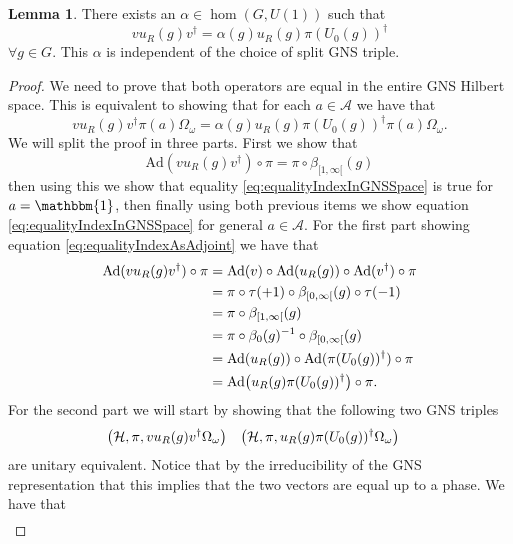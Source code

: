 \documentclass[12pt,a4paper,twoside]{article}
\let\originalleft\left
\let\originalright\right
\renewcommand{\left}{\mathopen{}\mathclose\bgroup\originalleft}
\renewcommand{\right}{\aftergroup\egroup\originalright}
\newcommand{\HH}{\mathcal H}
\renewcommand{\AA}{\mathcal A}
\newcommand{\one}{\mathbbm{1}}
\newcommand{\Ad}{\textrm{Ad}}
\theoremstyle{definition}
\newtheorem{lemma}[theorem]{Lemma}
\numberwithin{equation}{section}
\begin{document}
\begin{lemma}
	There exists an $\alpha\in\hom(G,U(1))$ such that
	\begin{equation}
		v u_R(g)v^\dagger =\alpha(g) u_R(g)\pi(U_0(g))^\dagger
	\end{equation}
	$\forall g\in G$. This $\alpha$ is independent of the choice of split GNS triple.
\end{lemma}
\begin{proof}
	We need to prove that both operators are equal in the entire GNS Hilbert space. This is equivalent to showing that for each $a\in\AA$ we have that
	\begin{equation}\label{eq:equalityIndexInGNSSpace}
		v u_R(g)v^\dagger \pi(a)\Omega_\omega =\alpha(g) u_R(g)\pi(U_0(g))^\dagger\pi(a)\Omega_\omega.
	\end{equation}
	We will split the proof in three parts. First we show that
	\begin{equation}\label{eq:equalityIndexAsAdjoint}
		\Ad(v u_R(g)v^\dagger)\circ\pi=\pi\circ\beta_{[1,\infty[}(g)
	\end{equation}
	then using this we show that equality \eqref{eq:equalityIndexInGNSSpace} is true for $a=\one$, then finally using both previous items we show equation \eqref{eq:equalityIndexInGNSSpace} for general $a\in\AA$. For the first part showing equation \eqref{eq:equalityIndexAsAdjoint} we have that
	\begin{align}
		\Ad(v u_R(g)v^\dagger)\circ\pi&=\Ad(v)\circ\Ad(u_R(g))\circ\Ad(v^\dagger)\circ\pi\\
		&=\pi\circ\tau(+1)\circ\beta_{[0,\infty[}(g)\circ\tau(-1)\\
		&=\pi\circ\beta_{[1,\infty[}(g)\\
		&=\pi\circ\beta_0(g)^{-1}\circ\beta_{[0,\infty[}(g)\\
		&=\Ad(u_R(g))\circ\Ad(\pi(U_0(g))^\dagger)\circ\pi\\
		&=\Ad\left(u_R(g)\pi(U_0(g))^\dagger\right)\circ\pi.
	\end{align}
	For the second part we will start by showing that the following two GNS triples
	\begin{align}\label{eq:TwoGNSTriples}
		\left(\HH,\pi,v u_R(g)v^\dagger \Omega_\omega\right)&&\left(\HH,\pi,u_R(g)\pi(U_0(g))^\dagger \Omega_\omega\right)&
	\end{align}
	are unitary equivalent. Notice that by the irreducibility of the GNS representation that this implies that the two vectors are equal up to a phase. We have that
	 \begin{align}

\end{align}
\end{proof}
\end{document}
